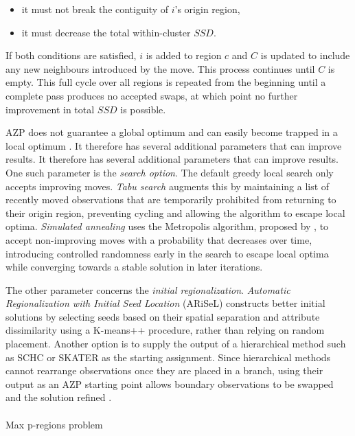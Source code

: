 \documentclass[
  english,
  12pt,
  a4paper,
]{article}
\makeatletter
\let\oldparagraph\paragraph
\renewcommand{\paragraph}{
    \@ifstar
      \xxxParagraphStar
      \xxxParagraphNoStar
  }
\newcommand{\xxxParagraphStar}[1]{\oldparagraph*{#1}\mbox{}}
\newcommand{\xxxParagraphNoStar}[1]{\oldparagraph{#1}\mbox{}}
\providecommand{\tightlist}{%
  \setlength{\itemsep}{0pt}\setlength{\parskip}{0pt}}
\makeatother
\begin{document}
\begin{itemize}
\tightlist
\item
  it must not break the contiguity of \(i\)'s origin region,
\item
  it must decrease the total within-cluster \(SSD\).
\end{itemize}

If both conditions are satisfied, \(i\) is added to region \(c\) and
\(C\) is updated to include any new neighbours introduced by the move.
This process continues until \(C\) is empty. This full cycle over all
regions is repeated from the beginning until a complete pass produces no
accepted swaps, at which point no further improvement in total \(SSD\)
is possible.

AZP does not guarantee a global optimum and can easily become trapped in
a local optimum \citet{anselin2024} . It therefore has several
additional parameters that can improve results. It therefore has several
additional parameters that can improve results. One such parameter is
the \emph{search option}. The default greedy local search only accepts
improving moves. \emph{Tabu search} augments this by maintaining a list
of recently moved observations that are temporarily prohibited from
returning to their origin region, preventing cycling and allowing the
algorithm to escape local optima. \emph{Simulated annealing} uses the
Metropolis algorithm, proposed by \citet{metropolis1953}, to accept
non-improving moves with a probability that decreases over time,
introducing controlled randomness early in the search to escape local
optima while converging towards a stable solution in later iterations.

The other parameter concerns the \emph{initial regionalization}.
\emph{Automatic Regionalization with Initial Seed Location} (ARiSeL)
constructs better initial solutions by selecting seeds based on their
spatial separation and attribute dissimilarity using a K-means++
procedure, rather than relying on random placement. Another option is to
supply the output of a hierarchical method such as SCHC or SKATER as the
starting assignment. Since hierarchical methods cannot rearrange
observations once they are placed in a branch, using their output as an
AZP starting point allows boundary observations to be swapped and the
solution refined \citep{anselin2024}.

\paragraph{Max p-regions problem}\label{max-p-regions-problem}
\end{document}
